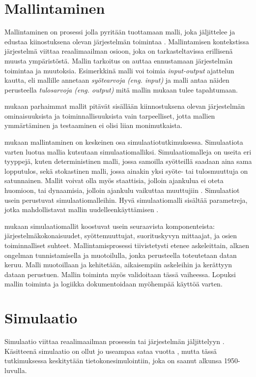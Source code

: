 \documentclass[utf8]{gradu3}
\begin{document}
\section{Mallintaminen} \label{mallintaminen}
Mallintaminen on prosessi jolla pyritään tuottamaan malli, joka jäljittelee 
ja edustaa kiinostuksena olevan järjestelmän toimintaa \parencite{maria1997introduction}. 
Mallintamisen kontekstissa järjestelmä viittaa reaalimaailman osioon, 
joka on tarkasteltavissa erillisenä muusta ympäristöstä.
Mallin tarkoitus on auttaa ennustamaan järjestelmän toimintaa ja muutoksia.
Esimerkkinä malli voi toimia \textit{input-output} ajattelun kautta, 
eli mallille annetaan \textit{syötearvoja (eng. input)} ja malli antaa näiden perusteella
\textit{tulosarvoja (eng. output)} mitä mallin mukaan tulee tapahtumaan.

\textcite{maria1997introduction} mukaan parhaimmat mallit pitävät 
sisällään kiinnostuksena olevan järjestelmän 
ominaisuuksista ja toiminnallisuuksista vain tarpeelliset, 
jotta mallien ymmärtäminen ja testaaminen ei olisi liian monimutkaista.

\textcite{maria1997introduction} mukaan mallintaminen on keskeinen osa simulaatiotutkimuksessa.
Simulaatiota varten luotua mallia kutsutaan simulaatiomalliksi.
Simulaatiomalleja on useita eri tyyppejä, kuten deterministinen malli, 
jossa samoilla syötteillä saadaan aina sama lopputulos, 
sekä stokastinen malli, jossa ainakin yksi syöte- tai tulosmuuttuja on satunnainen. 
Mallit voivat olla myös staattisia, jolloin ajankulua ei oteta huomioon, 
tai dynaamisia, jolloin ajankulu vaikuttaa muuttujiin \parencite{maria1997introduction}. 
Simulaatiot usein perustuvat simulaatiomalleihin. 
Hyvä simulaatiomalli sisältää parametreja,
jotka mahdollistavat mallin uudelleenkäyttämisen \parencite{introduction2005simulation}. 

\textcite{maria1997introduction} mukaan simulaatiomallit koostuvat usein seuraavista komponenteista: järjestelmäkokonaisuudet, syöttemuuttujat, suorituskyvyn mittaajat,
ja osien toiminnalliset suhteet. Mallintamisprosessi tiivistetysti etenee askeleittain, alkaen ongelman tunnistamisella ja muotoilulla, 
jonka perusteella toteutetaan datan keruu. Malli muotoillaan ja kehitetään, 
aikaisempiin askeleihin ja kerättyyn dataan perustuen. Mallin toiminta myös validoitaan tässä vaiheessa. 
Lopuksi mallin toiminta ja logiikka dokumentoidaan myöhempää käyttöä varten.

\section{Simulaatio} \label{simulaatio}
Simulaatio viittaa reaalimaailman prosessin tai 
järjestelmän jäljittelyyn \parencite{banks1999introduction}. 
Käsitteenä simulaatio on ollut jo useampaa sataa vuotta 
\parencite{HistoryOfSimulation}, 
mutta tässä tutkimuksessa keskitytään tietokonesimulointiin, 
joka on saanut alkunsa 1950-luvulla. 
%
\parencites%
    {HistoryOfSimulation}%
    {historyOfSimulation1996}
\relax
\end{document}
